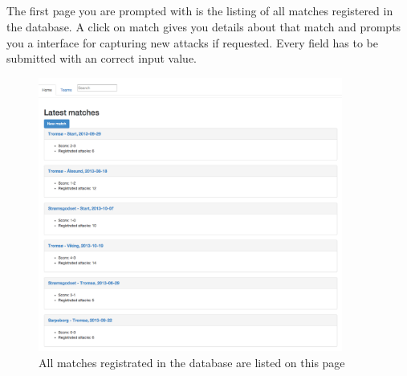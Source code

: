 \subsection{}

The first page you are prompted with is the listing of all matches registered in the database. A click on match gives you details about that match and prompts you a interface for capturing new attacks if requested. Every field has to be submitted with an correct input value.

\begin{figure}[ht!]
\centering
\includegraphics[width=100mm]{images/general/all_matches.png}
\caption{All matches registrated in the database are listed on this page}
\label{overflow}
\end{figure}


